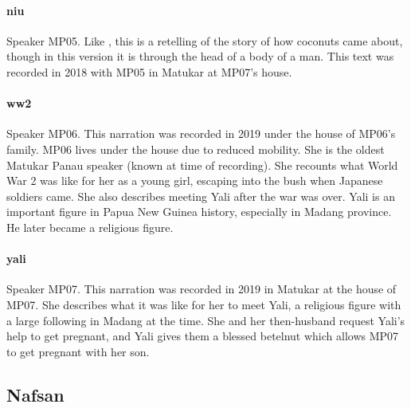 \paragraph{niu}
Speaker MP05. Like , this is a retelling of the story of how coconuts came about, though in this version it is through the head of a body of a man. This text was recorded in 2018 with MP05 in Matukar at MP07's house.

\paragraph{ww2}
Speaker MP06. This narration was recorded in 2019 under the house of MP06's family. MP06 lives under the house due to reduced mobility. She is the oldest Matukar Panau speaker (known at time of recording). She recounts what World War 2 was like for her as a young girl, escaping into the bush when Japanese soldiers came. She also describes meeting Yali after the war was over. Yali is an important figure in Papua New Guinea history, especially in Madang province. He later became a religious figure.

\paragraph{yali}
Speaker MP07. This narration was recorded in 2019 in Matukar at the house of MP07. She describes what it was like for her to meet Yali, a religious figure with a large following in Madang at the time. She and her then-husband request Yali's help to get pregnant, and Yali gives them a blessed betelnut which allows MP07 to get pregnant with her son.




\subsection{Nafsan}
\label{ssec:corpus-nafsan}

\noindent{}

